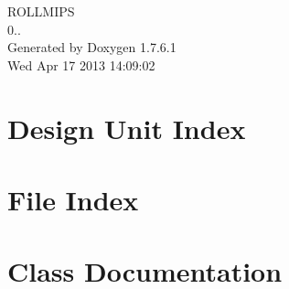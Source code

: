 \documentclass[a4paper]{book}
\begin{document}
\hypersetup{pageanchor=false,citecolor=blue}
\begin{titlepage}
\vspace*{7cm}
\begin{center}
{\Large \-R\-O\-L\-L\-M\-I\-P\-S \\[1ex]\large 0.. }\\
\vspace*{1cm}
{\large \-Generated by Doxygen 1.7.6.1}\\
\vspace*{0.5cm}
{\small Wed Apr 17 2013 14:09:02}\\
\end{center}
\end{titlepage}
\clearemptydoublepage
{}
\tableofcontents
\clearemptydoublepage
{}
\hypersetup{pageanchor=true,citecolor=blue}
\chapter{\-Design \-Unit \-Index}

\chapter{\-File \-Index}

\chapter{\-Class \-Documentation}













































\end{document}
